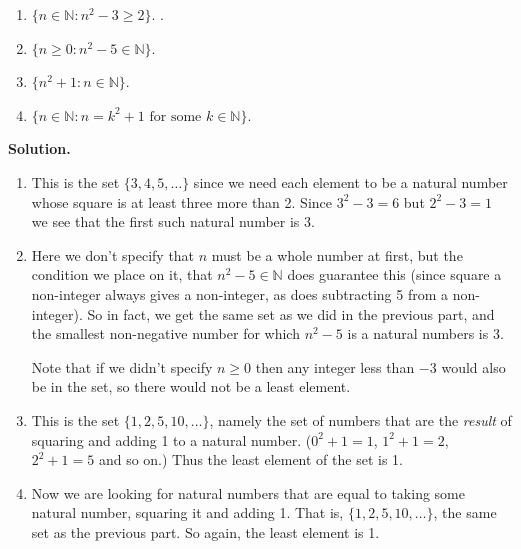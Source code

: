 \documentclass[12pt,]{book}
\theoremstyle{plain}
\theoremstyle{definition}
\theoremstyle{definition}
\theoremstyle{definition}
\numberwithin{equation}{chapter}
\newcommand{\N}{\mathbb N}
\newcommand{\st}{:}
\begin{document}
\begin{exerciselist}
\hypertarget{p-619}{}%
\leavevmode%
\begin{enumerate}[label=(\alph*)]
\item\hypertarget{li-285}{}\hypertarget{p-620}{}%
\(\{n \in \N \st n^2 - 3 \ge 2\}\).   \framebox[4em]{\raisebox{1ex}{}}.%
\item\hypertarget{li-286}{}\hypertarget{p-621}{}%
\(\{n \ge 0 \st n^2 - 5 \in \N\}\).   \framebox[4em]{\raisebox{1ex}{}}%
\item\hypertarget{li-287}{}\hypertarget{p-622}{}%
\(\{n^2+1 \st n \in \N\}\).  \framebox[4em]{\raisebox{1ex}{}}%
\item\hypertarget{li-288}{}\hypertarget{p-623}{}%
\(\{n \in \N \st n = k^2 + 1 \text{ for some } k \in \N\}\).  \framebox[4em]{\raisebox{1ex}{}}%
\end{enumerate}
%
\par
\medskip\noindent%
\textbf{Solution.}\quad \hypertarget{p-624}{}%
\leavevmode%
\begin{enumerate}[label=(\alph*)]
\item\hypertarget{li-289}{}\hypertarget{p-625}{}%
This is the set \(\{3, 4, 5, \ldots \}\) since we need each element to be a natural number whose square is at least three more than 2.  Since \(3^2 - 3 = 6\) but \(2^2 - 3 = 1\) we see that the first such natural number is 3.%
\item\hypertarget{li-290}{}\hypertarget{p-626}{}%
Here we don't specify that \(n\) must be a whole number at first, but the condition we place on it, that \(n^2 - 5 \in \N\) does guarantee this (since square a non-integer always gives a non-integer, as does subtracting 5 from a non-integer).  So in fact, we get the same set as we did in the previous part, and the smallest non-negative number for which \(n^2 - 5\) is a natural numbers is 3.%
\par
\hypertarget{p-627}{}%
Note that if we didn't specify \(n \ge 0\) then any integer less than \(-3\) would also be in the set, so there would not be a least element.%
\item\hypertarget{li-291}{}\hypertarget{p-628}{}%
This is the set \(\{1, 2, 5, 10, \ldots\}\), namely the set of numbers that are the \emph{result} of squaring and adding 1 to a natural number.  (\(0^2 + 1 = 1\), \(1^2 + 1 = 2\), \(2^2 + 1 = 5\) and so on.)  Thus the least element of the set is 1.%
\item\hypertarget{li-292}{}\hypertarget{p-629}{}%
Now we are looking for natural numbers that are equal to taking some natural number, squaring it and adding 1.  That is, \(\{1, 2, 5, 10, \ldots\}\), the same set as the previous part.  So again, the least element is 1.%

\end{enumerate}
\end{exerciselist}
\end{document}
